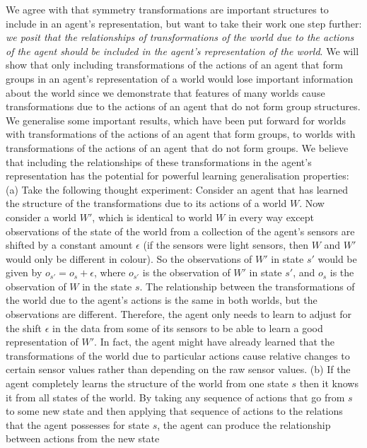 We agree with \autocite{Higgins2018} that symmetry transformations are important structures to include in an agent's representation, but want to take their work one step further: \textit{we posit that the relationships of transformations of the world due to the actions of the agent should be included in the agent's representation of the world}.
We will show that only including transformations of the actions of an agent that form groups in an agent's representation of a world would lose important information about the world since we demonstrate that features of many worlds cause transformations due to the actions of an agent that do not form group structures.
We generalise some important results, which have been put forward for worlds with transformations of the actions of an agent that form groups, to worlds with transformations of the actions of an agent that do not form groups.
We believe that including the relationships of these transformations in the agent's representation has the potential for powerful learning generalisation properties:
(a) Take the following thought experiment: Consider an agent that has learned the structure of the transformations due to its actions of a world $W$. Now consider a world $W'$, which is identical to world $W$ in every way except observations of the state of the world from a collection of the agent's sensors are shifted by a constant amount $\epsilon$ (if the sensors were light sensors, then $W$ and $W'$ would only be different in colour).
So the observations of $W'$ in state $s'$ would be given by $o_{s'} = o_{s} + \epsilon$, where $o_{s'}$ is the observation of $W'$ in state $s'$, and $o_{s}$ is the observation of $W$ in the state $s$.
The relationship between the transformations of the world due to the agent's actions is the same in both worlds, but the observations are different.
Therefore, the agent only needs to learn to adjust for the shift $\epsilon$ in the data from some of its sensors to be able to learn a good representation of $W'$.
In fact, the agent might have already learned that the transformations of the world due to particular actions cause relative changes to certain sensor values rather than depending on the raw sensor values.
(b)  If the agent completely learns the structure of the world from one state $s$ then it knows it from all states of the world.
By taking any sequence of actions that go from $s$ to some new state and then applying that sequence of actions to the relations that the agent possesses for state $s$, the agent can produce the relationship between actions from the new state
